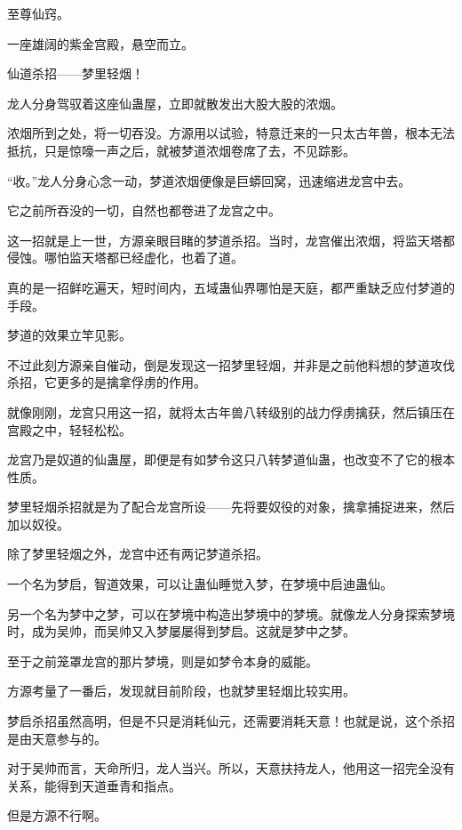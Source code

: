 
\begin{this_body}

至尊仙窍。

一座雄阔的紫金宫殿，悬空而立。

仙道杀招——梦里轻烟！

龙人分身驾驭着这座仙蛊屋，立即就散发出大股大股的浓烟。

浓烟所到之处，将一切吞没。方源用以试验，特意迁来的一只太古年兽，根本无法抵抗，只是惊嚎一声之后，就被梦道浓烟卷席了去，不见踪影。

“收。”龙人分身心念一动，梦道浓烟便像是巨蟒回窝，迅速缩进龙宫中去。

它之前所吞没的一切，自然也都卷进了龙宫之中。

这一招就是上一世，方源亲眼目睹的梦道杀招。当时，龙宫催出浓烟，将监天塔都侵蚀。哪怕监天塔都已经虚化，也着了道。

真的是一招鲜吃遍天，短时间内，五域蛊仙界哪怕是天庭，都严重缺乏应付梦道的手段。

梦道的效果立竿见影。

不过此刻方源亲自催动，倒是发现这一招梦里轻烟，并非是之前他料想的梦道攻伐杀招，它更多的是擒拿俘虏的作用。

就像刚刚，龙宫只用这一招，就将太古年兽八转级别的战力俘虏擒获，然后镇压在宫殿之中，轻轻松松。

龙宫乃是奴道的仙蛊屋，即便是有如梦令这只八转梦道仙蛊，也改变不了它的根本性质。

梦里轻烟杀招就是为了配合龙宫所设——先将要奴役的对象，擒拿捕捉进来，然后加以奴役。

除了梦里轻烟之外，龙宫中还有两记梦道杀招。

一个名为梦启，智道效果，可以让蛊仙睡觉入梦，在梦境中启迪蛊仙。

另一个名为梦中之梦，可以在梦境中构造出梦境中的梦境。就像龙人分身探索梦境时，成为吴帅，而吴帅又入梦屡屡得到梦启。这就是梦中之梦。

至于之前笼罩龙宫的那片梦境，则是如梦令本身的威能。

方源考量了一番后，发现就目前阶段，也就梦里轻烟比较实用。

梦启杀招虽然高明，但是不只是消耗仙元，还需要消耗天意！也就是说，这个杀招是由天意参与的。

对于吴帅而言，天命所归，龙人当兴。所以，天意扶持龙人，他用这一招完全没有关系，能得到天道垂青和指点。

但是方源不行啊。


\end{this_body}
